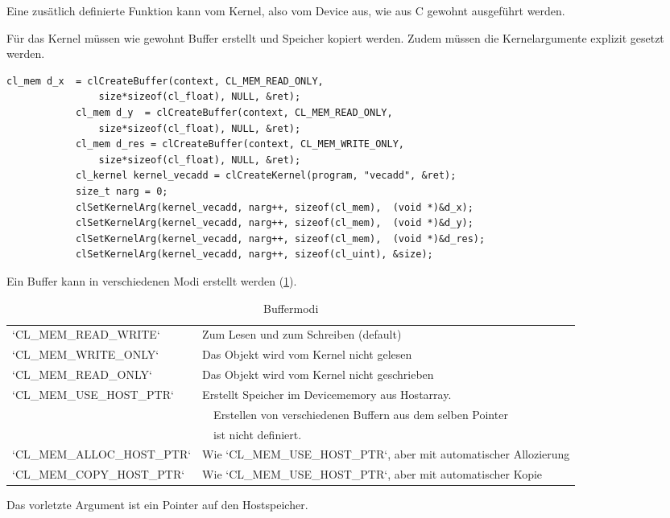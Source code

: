 			Eine zusätlich definierte Funktion kann vom \Gls{Kernel}, also vom Device aus, wie aus C gewohnt ausgeführt werden. 
			
			Für das \Gls{Kernel} müssen wie gewohnt Buffer erstellt und Speicher kopiert werden. Zudem müssen die Kernelargumente explizit gesetzt werden.
			\begin{lstlisting}[caption=~Kernelaufruf]
			cl_mem d_x  = clCreateBuffer(context, CL_MEM_READ_ONLY, 
				size*sizeof(cl_float), NULL, &ret);
			cl_mem d_y  = clCreateBuffer(context, CL_MEM_READ_ONLY, 
				size*sizeof(cl_float), NULL, &ret);
			cl_mem d_res = clCreateBuffer(context, CL_MEM_WRITE_ONLY, 
				size*sizeof(cl_float), NULL, &ret);
			cl_kernel kernel_vecadd = clCreateKernel(program, "vecadd", &ret);	
			size_t narg = 0;
			clSetKernelArg(kernel_vecadd, narg++, sizeof(cl_mem),  (void *)&d_x);
			clSetKernelArg(kernel_vecadd, narg++, sizeof(cl_mem),  (void *)&d_y);
			clSetKernelArg(kernel_vecadd, narg++, sizeof(cl_mem),  (void *)&d_res);
			clSetKernelArg(kernel_vecadd, narg++, sizeof(cl_uint), &size);
			\end{lstlisting}
			
			Ein Buffer kann in verschiedenen Modi erstellt werden (\ref{tab4:flags}).
			\begin{table}[h]
				\centering
				\begin{tabular}{|l|l|}\hline
				\li`CL_MEM_READ_WRITE` & Zum Lesen und zum Schreiben (default) \\
				\li`CL_MEM_WRITE_ONLY` & Das Objekt wird vom \Gls{Kernel} nicht gelesen \\	
				\li`CL_MEM_READ_ONLY`  & Das Objekt wird vom \Gls{Kernel} nicht geschrieben \\
				\li`CL_MEM_USE_HOST_PTR` & Erstellt Speicher im Devicememory aus Hostarray.\\
				                         & ~~Erstellen von verschiedenen Buffern aus dem selben Pointer\\
				                         & ~~ist nicht definiert.\\
				\li`CL_MEM_ALLOC_HOST_PTR` & Wie \li`CL_MEM_USE_HOST_PTR`, aber mit automatischer Allozierung \\
				\li`CL_MEM_COPY_HOST_PTR`  & Wie \li`CL_MEM_USE_HOST_PTR`, aber mit automatischer Kopie\\ \hline
				\end{tabular}
				\caption{Buffermodi}
				\label{tab4:flags}
			\end{table}
			
			Das vorletzte Argument ist ein Pointer auf den Hostspeicher.
			
